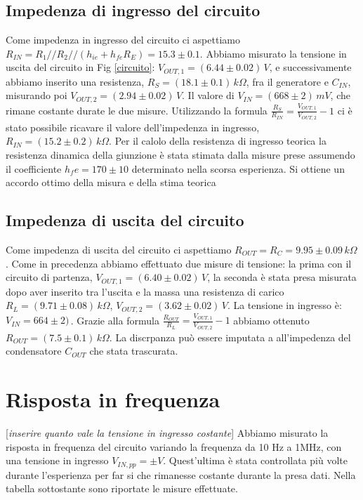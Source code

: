 \documentclass[10pt,a4paper]{article}
\newcommand{\rem}[1]{[\emph{#1}]}
\begin{document}
\subsection{Impedenza di ingresso del circuito}
Come impedenza in ingresso del circuito ci aspettiamo $R_{IN}=R_1//R_2//(h_{ie}+h_{fe}R_E) = 15.3\pm0.1$.
Abbiamo misurato la tensione in uscita del circuito in Fig \ref{circuito}: $V_{OUT,1} = (6.44\pm0.02) \, V$, e successivamente abbiamo inserito una resistenza, $R_S= (18.1\pm0.1) \, k\Omega$, fra il generatore e $C_{IN}$, misurando poi $V_{OUT,2}= (2.94 \pm 0.02) \, V$. Il valore di $V_{IN} = (668 \pm 2) \, mV$, che rimane costante durate le due misure. Utilizzando la formula $\frac{R_S}{R_{IN}}=\frac{V_{OUT,1}}{V_{OUT,2}}-1$ ci è stato possibile ricavare il valore dell'impedenza in ingresso, $R_{IN}= (15.2\pm0.2)\, k\Omega$. 
Per il calolo della resistenza di ingresso teorica la resistenza dinamica della giunzione è stata stimata dalla misure prese assumendo il coefficiente $h_fe = 170\pm10$ determinato nella scorsa esperienza. Si ottiene un accordo ottimo della misura e della stima teorica

\subsection{Impedenza di uscita del circuito}
Come impedenza di uscita del circuito ci aspettiamo $R_{OUT}= R_C = 9.95\pm0.09\, k\Omega$. Come in precedenza abbiamo effettuato due misure di tensione: la prima con il circuito di partenza, $V_{OUT,1}= (6.40\pm0.02) \, V$, la seconda è stata presa misurata dopo aver inserito tra l'uscita e la massa una resistenza di carico $R_L = (9.71 \pm 0.08) \, k\Omega$, $V_{OUT,2}= (3.62\pm0.02)\,V$. La tensione in ingresso è: $V_{IN} = 664 \pm 2) \,$. Grazie alla formula $\frac{R_{OUT}}{R_{L}}=\frac{V_{OUT,1}}{V_{OUT,2}}-1$ abbiamo ottenuto $R_{OUT}= (7.5\pm0.1)\, k\Omega$. La discrpanza può essere imputata a all'impedenza del condensatore $C_{OUT}$ che stata trascurata.


\section{Risposta in frequenza}
\rem{inserire quanto vale la tensione in ingresso costante}
Abbiamo misurato la risposta in frequenza del circuito variando la frequenza da 10 Hz a 1MHz, con una tensione in ingresso $V_{IN,pp}= \pm V$. Quest'ultima è stata controllata più volte durante l'esperienza per far si che rimanesse costante durante la presa dati. Nella tabella sottostante sono riportate le misure effettuate.
\end{document}

